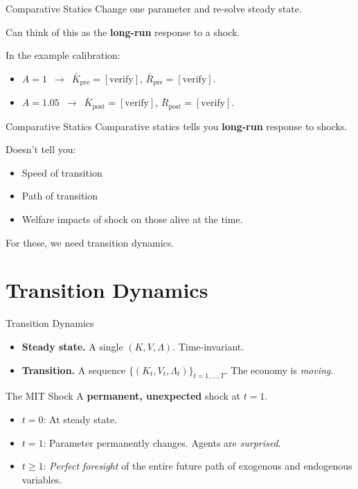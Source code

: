 \documentclass[10pt,aspectratio=169]{beamer}
\begin{document}
\begin{frame}{Comparative Statics}
  Change one parameter and re-solve steady state.

  Can think of this as the \textbf{long-run} response to a shock.

  In the example calibration:
  \begin{itemize}
    \item $A = 1$ \,$\to$\, $\bar K_{\mathrm{pre}} = [\text{verify}]$, $\bar R_{\mathrm{pre}} = [\text{verify}]$.
    \item $A = 1.05$ \,$\to$\, $\bar K_{\mathrm{post}} = [\text{verify}]$, $\bar R_{\mathrm{post}} = [\text{verify}]$.
  \end{itemize}
\end{frame}

\begin{frame}{Comparative Statics}
  Comparative statics tells you \textbf{long-run} response to shocks.

  Doesn't tell you:
  \begin{itemize}
    \item Speed of transition
    \item Path of transition
    \item Welfare impacts of shock on those alive at the time.
  \end{itemize}

  For these, we need transition dynamics.
\end{frame}

\section[Transition Dynamics]{Transition Dynamics}

\begin{frame}{Transition Dynamics}
  \begin{itemize}
    \item \textbf{Steady state.} A single $(K, V, \Lambda)$. Time-invariant.
    \item \textbf{Transition.} A sequence $\{(K_t, V_t, \Lambda_t)\}_{t = 1,\dots,T}$. The economy is \emph{moving}.
  \end{itemize}
\end{frame}

\begin{frame}{The MIT Shock}
  A \textbf{permanent, unexpected} shock at $t = 1$.
  \begin{itemize}
    \item $t = 0$: At steady state.
    \item $t = 1$: Parameter permanently changes. Agents are \emph{surprised}.
    \item $t \geq 1$: \emph{Perfect foresight} of the entire future path of exogenous and endogenous variables.
  \end{itemize}
\end{frame}
\end{document}

